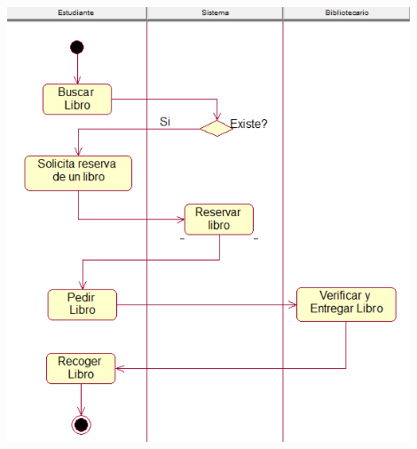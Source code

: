 \begin{enumerate}[1.]
\begin{center}
	\includegraphics[width=12cm]{./Imagenes/img6} 
	\end{center}
\end{enumerate} 
